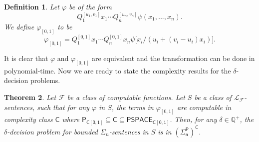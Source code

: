 \documentclass[conference]{IEEEtran}
\newtheorem{theorem}{Theorem}
\newtheorem{definition}[theorem]{Definition}
\begin{document}

\begin{definition}
Let $\varphi$ be of the form 
$$Q_1^{[u_1,v_1]}x_1 \cdots Q_n^{[u_n,v_n]}\psi(x_1,...,x_n).$$ 
We define $\varphi_{[0,1]}$ to be 
$$\varphi_{[0,1]} = Q_1^{[0,1]} x_1 \cdots Q_n^{[0,1]}x_n\psi\big[x_i\big/(u_i+(v_i-u_i)x_i)\big].$$
\end{definition} 

It is clear that $\varphi$ and $\varphi_{[0,1]}$ are equivalent and the transformation can be done in polynomial-time. Now we are ready to state the complexity results for the $\delta$-decision problems. 

\begin{theorem}\label{compmain}
Let $\mathcal{F}$ be a class of computable functions. Let $S$ be a class of $\mathcal{L}_{\mathcal{F}}$-sentences, such that for any $\varphi$ in $S$, the terms in $\varphi_{[0,1]}$ are computable in complexity class $\mathsf{C}$ where $\mathsf{P_{C[0,1]}\subseteq \mathsf{C}\subseteq \mathsf{PSPACE_{C[0,1]}}}$. Then, for any $\delta\in \mathbb{Q}^+$, the $\delta$-decision problem for bounded $\Sigma_n$-sentences in $S$ is in $\mathsf{(\Sigma_n^P)^C}$.
\end{theorem}
\end{document}
